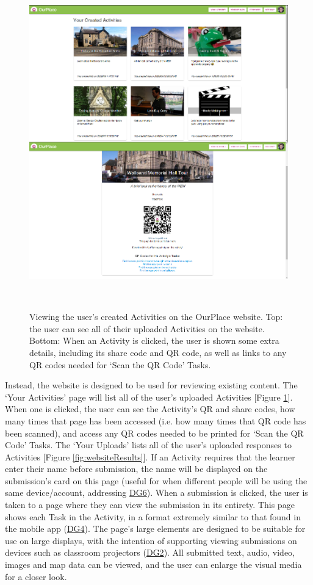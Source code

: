\begin{figure}
  \centering
  \includegraphics[width=0.85\columnwidth]{images/chapter05/webActivities.png}
  \caption[The OurPlace website: the user's Activities]{Viewing the user's created Activities on the OurPlace website. Top: the user can see all of their uploaded Activities on the website. Bottom: When an Activity is clicked, the user is shown some extra details, including its share code and QR code, as well as links to any QR codes needed for `Scan the QR Code' Tasks.}~\label{fig:websiteActivities}
\end{figure}

Instead, the website is designed to be used for reviewing existing content. The `Your Activities' page will list all of the user's uploaded Activities [Figure \ref{fig:websiteActivities}]. When one is clicked, the user can see the Activity's QR and share codes, how many times that page has been accessed (i.e. how many times that QR code has been scanned), and access any QR codes needed to be printed for `Scan the QR Code' Tasks. The `Your Uploads' lists all of the user's uploaded responses to Activities [Figure \ref{fig:websiteResults}]. If an Activity requires that the learner enter their name before submission, the name will be displayed on the submission's card on this page (useful for when different people will be using the same device/account, addressing \hyperref[DG6]{DG6}). When a submission is clicked, the user is taken to a page where they can view the submission in its entirety. This page shows each Task in the Activity, in a format extremely similar to that found in the mobile app (\hyperref[DG4]{DG4}). The page's large elements are designed to be suitable for use on large displays, with the intention of supporting viewing submissions on devices such as classroom projectors (\hyperref[DG2]{DG2}). All submitted text, audio, video, images and map data can be viewed, and the user can enlarge the visual media for a closer look.

